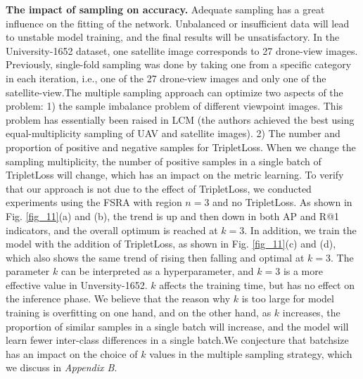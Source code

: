 \documentclass[lettersize,journal]{IEEEtran}
\begin{document}
\textbf{The impact of sampling on accuracy.} Adequate sampling has a great influence on the fitting of the network. Unbalanced or insufficient data will lead to unstable model training, and the final results will be unsatisfactory. In the University-1652 dataset, one satellite image corresponds to 27 drone-view images. Previously, single-fold sampling was done by taking one from a specific category in each iteration, i.e., one of the 27 drone-view images and only one of the satellite-view.The multiple sampling approach can optimize two aspects of the problem: 1) the sample imbalance problem of different viewpoint images.  This problem has essentially been raised in LCM \cite{ref24} (the authors achieved the best using equal-multiplicity sampling of UAV and satellite images). 2) The number and proportion of positive and negative samples for TripletLoss. When we change the sampling multiplicity, the number of positive samples in a single batch of TripletLoss will change, which has an impact on the metric learning. To verify that our approach is not due to the effect of TripletLoss, we conducted experiments using the FSRA with region $n=3$ and no TripletLoss. As shown in Fig. \ref{fig_11}(a) and (b), the trend is up and then down in both AP and R@1 indicators, and the overall optimum is reached at $k=3$. In addition, we train the model with the addition of TripletLoss, as shown in Fig. \ref{fig_11}(c) and (d), which also shows the same trend of rising then falling and optimal at $k=3$. The parameter $k$ can be interpreted as a hyperparameter, and $k=3$ is a more effective value in Unversity-1652. $k$ affects the training time, but has no effect on the inference phase. We believe that the reason why $k$ is too large for model training is overfitting on one hand, and on the other hand, as $k$ increases, the proportion of similar samples in a single batch will increase, and the model will learn fewer inter-class differences in a single batch.We conjecture that batchsize has an impact on the choice of $k$ values in the multiple sampling strategy, which we discuss in \emph{Appendix B}.
\end{document}
